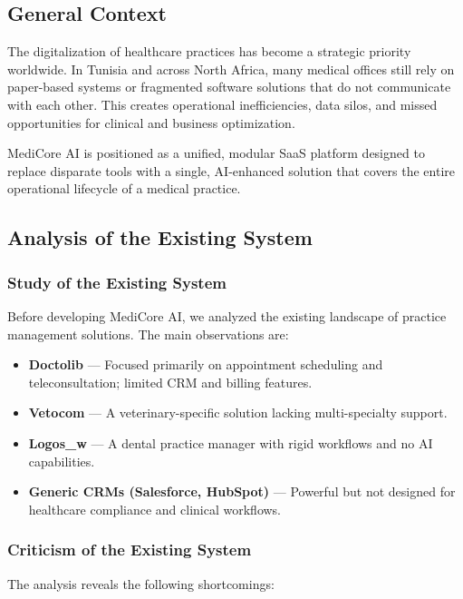 \documentclass[12pt,a4paper,oneside]{report}
\begin{document}
\subsection{General Context}
The digitalization of healthcare practices has become a strategic priority worldwide. In Tunisia and across North Africa, many medical offices still rely on paper-based systems or fragmented software solutions that do not communicate with each other. This creates operational inefficiencies, data silos, and missed opportunities for clinical and business optimization.

MediCore AI is positioned as a unified, modular SaaS platform designed to replace disparate tools with a single, AI-enhanced solution that covers the entire operational lifecycle of a medical practice.

\subsection{Analysis of the Existing System}

\subsubsection{Study of the Existing System}
Before developing MediCore AI, we analyzed the existing landscape of practice management solutions. The main observations are:

\begin{itemize}
    \item \textbf{Doctolib} — Focused primarily on appointment scheduling and teleconsultation; limited CRM and billing features.
    \item \textbf{Vetocom} — A veterinary-specific solution lacking multi-specialty support.
    \item \textbf{Logos\_w} — A dental practice manager with rigid workflows and no AI capabilities.
    \item \textbf{Generic CRMs (Salesforce, HubSpot)} — Powerful but not designed for healthcare compliance and clinical workflows.
\end{itemize}

\subsubsection{Criticism of the Existing System}
The analysis reveals the following shortcomings:
\end{document}
